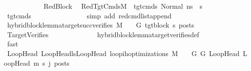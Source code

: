 \begin{isabellebody}
\ \ \ \ \ \ \ \ \ \ \isamarkupfalse%
\ RedBlock{}\ \isamarkupfalse%
\ RedTgtCmds{}{\isacharcolon}{\kern0pt}{\isachardoublequoteopen}M{\isacharcomma}{\kern0pt}{\isasymLambda}{\isacharcomma}{\kern0pt}{\isasymGamma}{\isacharcomma}{\kern0pt}{\isasymOmega}\ {\isasymturnstile}\ {\isasymlangle}tgt{\isacharunderscore}{\kern0pt}cmds{\isacharunderscore}{\kern0pt}{}\ {\isacharcomma}{\kern0pt}Normal\ ns{\isasymrangle}\ {\isacharbrackleft}{\kern0pt}{\isasymrightarrow}{\isacharbrackright}{\kern0pt}\ s{}{\isacharprime}{\kern0pt}{\isachardoublequoteclose}\isanewline
\ \ \ \ \ \ \ \ \ \ \ \ \isamarkupfalse%
\ {\isacartoucheopen}tgt{\isacharunderscore}{\kern0pt}cmds{\isacharunderscore}{\kern0pt}{}\ {\isacharequal}{\kern0pt}\ {\isacharunderscore}{\kern0pt}{\isacartoucheclose}\isanewline
\ \ \ \ \ \ \ \ \ \ \ \ \isamarkupfalse%
\ {\isacharparenleft}{\kern0pt}simp\ add{\isacharcolon}{\kern0pt}\ red{\isacharunderscore}{\kern0pt}cmd{\isacharunderscore}{\kern0pt}list{\isacharunderscore}{\kern0pt}append{\isacharparenright}{\kern0pt}\isanewline
\isanewline
\ \ \ \ \ \ \ \ \ \ \isanewline
\ \ \ \ \ \ \ \ \ \ \isamarkupfalse%
\ {\isachardoublequoteopen}hybrid{\isacharunderscore}{\kern0pt}block{\isacharunderscore}{\kern0pt}lemma{\isacharunderscore}{\kern0pt}target{\isacharunderscore}{\kern0pt}succ{\isacharunderscore}{\kern0pt}verifies\ M\ {\isasymLambda}\ {\isasymGamma}\ {\isasymOmega}\ G{\isacharprime}{\kern0pt}\ tgt{\isacharunderscore}{\kern0pt}block\ s{}{\isacharprime}{\kern0pt}\ posts{\isachardoublequoteclose}\isanewline
\ \ \ \ \ \ \ \ \ \ \ \ \isamarkupfalse%
\ TargetVerifies\isanewline
\ \ \ \ \ \ \ \ \ \ \ \ \isamarkupfalse%
\ hybrid{\isacharunderscore}{\kern0pt}block{\isacharunderscore}{\kern0pt}lemma{\isacharunderscore}{\kern0pt}target{\isacharunderscore}{\kern0pt}verifies{\isacharunderscore}{\kern0pt}def\isanewline
\ \ \ \ \ \ \ \ \ \ \ \ \isamarkupfalse%
\ fast\isanewline
\ \ \ \ \ \ \ \ \isamarkupfalse%
\isanewline
\ \ \ \ \ \ \ \ \isanewline
\ \ \ \ \ \ \ \ \isamarkupfalse%
\ {\isachardoublequoteopen}{\isasymforall}{\isacharparenleft}{\kern0pt}LoopHead{\isacharcomma}{\kern0pt}\ LoopHead{\isacharprime}{\kern0pt}{\isacharparenright}{\kern0pt}{\isasymin}lsLoopHead{\isachardot}{\kern0pt}\ loop{\isacharunderscore}{\kern0pt}ih{\isacharunderscore}{\kern0pt}optimizations\ M\ {\isasymLambda}\ {\isasymGamma}\ {\isasymOmega}\ G\ G{\isacharprime}{\kern0pt}\ LoopHead\ LoopHead{\isacharprime}{\kern0pt}\ m{\isacharprime}{\kern0pt}\ s{\isacharprime}{\kern0pt}\ {\isacharparenleft}{\kern0pt}j{\isacharminus}{\kern0pt}{}{\isacharparenright}{\kern0pt}\ posts{\isachardoublequoteclose}\isanewline

\end{isabellebody}
